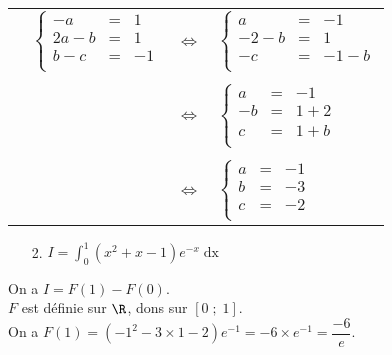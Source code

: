 \begin{tabular}{llll}
\hspace*{5cm}
&
$\left\{
  \begin{array}{rll}
    -a & = & 1 \\
    2a-b & = & 1 \\
    b - c & = & -1 \\
  \end{array}
\right.$
&
$\Longleftrightarrow$
& 
$\left\{
  \begin{array}{rll}
    a & = & -1 \\
    -2-b & = & 1 \\
    - c & = & -1-b \\
  \end{array}
\right.$
\\
& & & \\
& & $\Longleftrightarrow$ & 
$\left\{
  \begin{array}{rll}
    a & = & -1 \\
    -b & = & 1 + 2 \\
    c & = & 1 + b \\
  \end{array}
\right.$ 
\\
& & & \\
& & $\Longleftrightarrow$ & 
$\left\{
  \begin{array}{rll}
    a & = & -1 \\
    b & = & -3 \\
    c & = & -2 \\
  \end{array}
\right.$
\\
\end{tabular}

\vspace*{.3cm}

\begin{itemize}
\item[2.] $I = \displaystyle \int_0^1 \left(x^2 + x - 1\right)e^{-x} \; \mathrm{dx}$ \\
\end{itemize}

On a $I = F\left(1\right) - F\left(0\right)$. \\

$F$ est définie sur $\R$, dons sur $\left[0 \; ; \; 1\right]$. \\

On a $F(1) = \left(-1^2 - 3 \times 1 - 2\right)e^{-1} = -6 \times e^{-1} = \dfrac{-6}{e}$. \\

